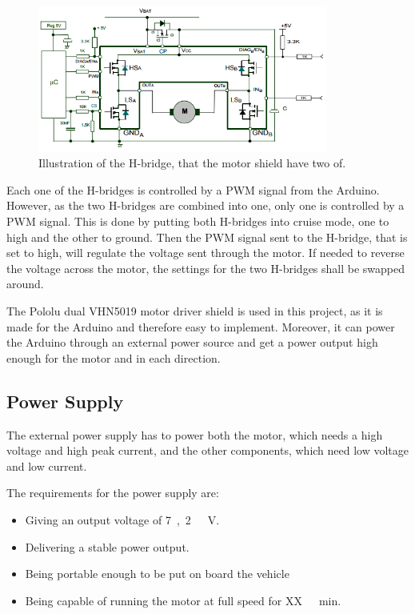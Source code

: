 \begin{figure}[H]
	\centering
	\includegraphics[width=0.85\textwidth]{figures/Hbridges.png}
		\caption{Illustration of the H-bridge, that the motor shield have two of.}
	\label{Hbridges}
\end{figure}
%
Each one of the H-bridges is controlled by a PWM signal from the Arduino. However, as the two H-bridges are combined into one, only one is controlled by a PWM signal. This is done by putting both H-bridges into cruise mode, one to high and the other to ground. Then the PWM signal sent to the H-bridge, that is set to high, will regulate the voltage sent through the motor. If needed to reverse the voltage across the motor, the settings for the two H-bridges shall be swapped around.

The Pololu dual VHN5019 motor driver shield is used in this project, as it is made for the Arduino and therefore easy to implement. Moreover, it can power the Arduino through an external power source and get a power output high enough for the motor and in each direction.



\subsection{Power Supply}
The external power supply has to power both the motor, which needs a high voltage and high peak current, and the other components, which need low voltage and low current.

The requirements for the power supply are:
\begin{itemize}
\item Giving an output voltage of \si{7,2\ V}.
\item Delivering a stable power output.
\item Being portable enough to be put on board the vehicle
\item Being capable of running the motor at full speed for \si{XX\ min}. 
\end{itemize}

